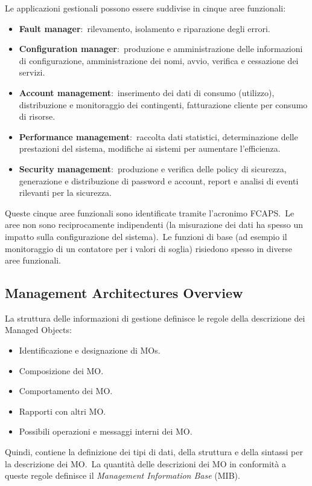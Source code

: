 Le applicazioni gestionali possono essere suddivise in cinque aree funzionali:
\begin{itemize}
    \item \textbf{Fault manager}:\ rilevamento, isolamento e riparazione degli errori.
    \item \textbf{Configuration manager}:\ produzione e amministrazione delle informazioni di configurazione, amministrazione dei nomi, avvio, verifica e cessazione dei servizi.
    \item \textbf{Account management}:\ inserimento dei dati di consumo (utilizzo), distribuzione e monitoraggio dei contingenti, fatturazione cliente per consumo di risorse.
    \item \textbf{Performance management}:\ raccolta dati statistici, determinazione delle prestazioni del sistema, modifiche ai sistemi per aumentare l'efficienza.
    \item \textbf{Security management}:\ produzione e verifica delle policy di sicurezza, generazione e distribuzione di password e account, report e analisi di eventi rilevanti per la sicurezza.
\end{itemize}

\noindent Queste cinque aree funzionali sono identificate tramite l'acronimo FCAPS.\
Le aree non sono reciprocamente indipendenti (la misurazione dei dati ha spesso un impatto sulla configurazione del sistema).\
Le funzioni di base (ad esempio il monitoraggio di un contatore per i valori di soglia) risiedono spesso in diverse aree funzionali.

\subsection{Management Architectures Overview}

La struttura delle informazioni di gestione definisce le regole della descrizione dei Managed Objects:
\begin{itemize}
    \item Identificazione e designazione di MOs.
    \item Composizione dei MO.
    \item Comportamento dei MO.
    \item Rapporti con altri MO.
    \item Possibili operazioni e messaggi interni dei MO.
\end{itemize}
Quindi, contiene la definizione dei tipi di dati, della struttura e della sintassi per la descrizione dei MO.\
La quantità delle descrizioni dei MO in conformità a queste regole definisce il \textit{Management Information Base} (MIB).

